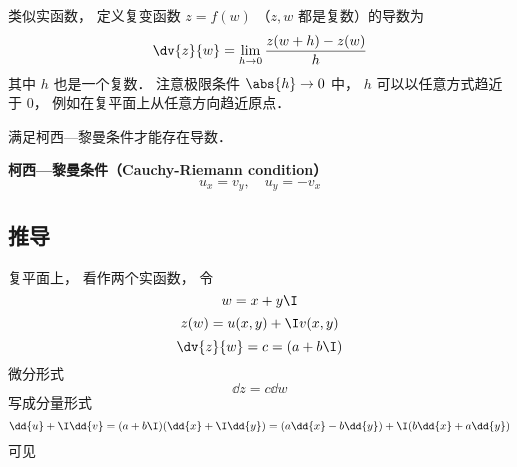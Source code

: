 
类似实函数， 定义复变函数 $z = f(w)$ （$z, w$ 都是复数）的导数为
\begin{equation}
\dv{z}{w} = \lim_{h\to 0} \frac{z(w + h) - z(w)}{h}
\end{equation}
其中 $h$ 也是一个复数． 注意极限条件 $\abs{h}\to 0$ 中， $h$ 可以以任意方式趋近于 $0$， 例如在复平面上从任意方向趋近原点．

满足柯西—黎曼条件才能存在导数．

\textbf{柯西—黎曼条件（Cauchy-Riemann condition）}
\begin{equation}\label{CauRie_eq1}
u_{x}=v_{y}, \quad u_{y}=-v_{x}
\end{equation}


\subsection{推导}
复平面上， 看作两个实函数， 令
\begin{equation}
w = x + y\I
\end{equation}
\begin{equation}
z(w) = u(x, y) + \I v(x, y)
\end{equation}
\begin{equation}
\dv{z}{w} = c = (a + b\I)
\end{equation}
微分形式
\begin{equation}
\dd{z} = c\dd{w}
\end{equation}
写成分量形式
\begin{equation}
\dd{u} + \I \dd{v} = (a + b\I)(\dd{x} + \I\dd{y}) = (a \dd{x} - b\dd{y}) + \I (b \dd{x} + a\dd{y})
\end{equation}
可见
\begin{equation}

\end{equation}

